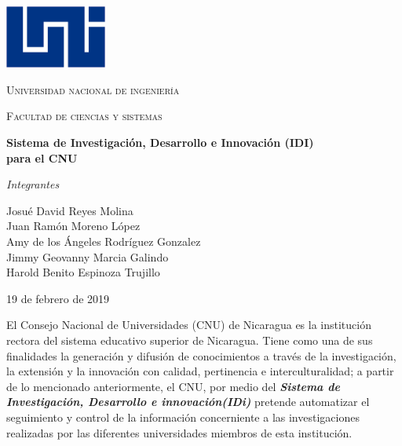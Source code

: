 \documentclass[12pt,letterpaper]{report}
\begin{document}
\begin{titlepage}
	\centering
	\includegraphics[width=0.25\textwidth]{img/logo.png}\par\vspace{1cm}
	{\scshape\LARGE Universidad nacional de ingeniería \par}
	\vspace{0.25cm}
	{\scshape\Large Facultad de ciencias y sistemas\par}
	\vspace{2.5cm}
	{\large\bfseries Sistema de Investigación, Desarrollo e Innovación (IDI)\\ para el CNU\par}
	\vspace{2cm}

	\vfill
	\begin{center}
		{\Large\itshape Integrantes\par}\vspace{0.5cm}
		Josué David Reyes Molina\\ \vspace{0.15cm}
		Juan Ramón Moreno López\\ \vspace{0.15cm}
		Amy de los Ángeles Rodríguez Gonzalez\\ \vspace{0.15cm}
		Jimmy Geovanny Marcia Galindo\\ \vspace{0.15cm}
		Harold Benito Espinoza Trujillo\\ \vspace{0.15cm}
	\end{center}
	\vfill

	{\large 19 de febrero de 2019\par}
\end{titlepage}

El Consejo Nacional de Universidades (CNU) de Nicaragua es la institución rectora del sistema educativo superior de Nicaragua. Tiene como una de sus finalidades la generación y difusión de conocimientos a través de la investigación, la extensión y la innovación con calidad, pertinencia e interculturalidad; a partir de lo mencionado anteriormente, el CNU, por medio del \textbf{\emph{Sistema de Investigación, Desarrollo e innovación(IDi)}} pretende automatizar el seguimiento y control de la información concerniente a las investigaciones realizadas por las diferentes universidades miembros de esta institución.
\end{document}
